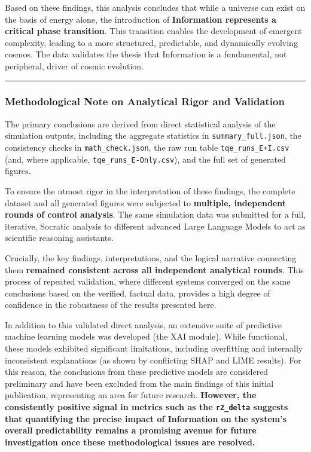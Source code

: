 Based on these findings, this analysis concludes that while a universe
can exist on the basis of energy alone, the introduction of
\textbf{Information represents a critical phase transition}. This
transition enables the development of emergent complexity, leading to a
more structured, predictable, and dynamically evolving cosmos. The data
validates the thesis that Information is a fundamental, not peripheral,
driver of cosmic evolution.

\begin{center}\rule{0.5\linewidth}{0.5pt}\end{center}

\subsubsection{Methodological Note on Analytical Rigor and
Validation}\label{methodological-note-on-analytical-rigor-and-validation}

The primary conclusions are derived from direct statistical analysis of
the simulation outputs, including the aggregate statistics in
\texttt{summary\_full.json}, the consistency checks in
\texttt{math\_check.json}, the raw run table \texttt{tqe\_runs\_E+I.csv}
(and, where applicable, \texttt{tqe\_runs\_E-Only.csv}), and the full
set of generated figures.

To ensure the utmost rigor in the interpretation of these findings, the
complete dataset and all generated figures were subjected to
\textbf{multiple, independent rounds of control analysis}. The same
simulation data was submitted for a full, iterative, Socratic analysis
to different advanced Large Language Models to act as scientific
reasoning assistants.

Crucially, the key findings, interpretations, and the logical narrative
connecting them \textbf{remained consistent across all independent
analytical rounds}. This process of repeated validation, where different
systems converged on the same conclusions based on the verified, factual
data, provides a high degree of confidence in the robustness of the
results presented here.

In addition to this validated direct analysis, an extensive suite of
predictive machine learning models was developed (the XAI module). While
functional, these models exhibited significant limitations, including
overfitting and internally inconsistent explanations (as shown by
conflicting SHAP and LIME results). For this reason, the conclusions
from these predictive models are considered preliminary and have been
excluded from the main findings of this initial publication,
representing an area for future research. \textbf{However, the
consistently positive signal in metrics such as the \texttt{r2\_delta}
suggests that quantifying the precise impact of Information on the
system's overall predictability remains a promising avenue for future
investigation once these methodological issues are resolved.}

